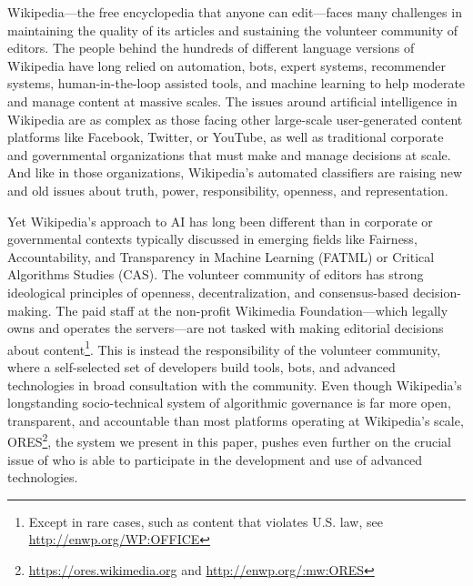 Wikipedia---the free encyclopedia that anyone can edit---faces many challenges in maintaining the quality of its articles and sustaining the volunteer community of editors. The people behind the hundreds of different language versions of Wikipedia have long relied on automation, bots, expert systems, recommender systems, human-in-the-loop assisted tools, and machine learning to help moderate and manage content at massive scales. The issues around artificial intelligence in Wikipedia are as complex as those facing other large-scale user-generated content platforms like Facebook, Twitter, or YouTube, as well as traditional corporate and governmental organizations that must make and manage decisions at scale. And like in those organizations, Wikipedia's automated classifiers are raising new and old issues about truth, power, responsibility, openness, and representation.

Yet Wikipedia's approach to AI has long been different than in corporate or governmental contexts typically discussed in emerging fields like Fairness, Accountability, and Transparency in Machine Learning (FATML) or Critical Algorithms Studies (CAS). The volunteer community of editors has strong ideological principles of openness, decentralization, and consensus-based decision-making. The paid staff at the non-profit Wikimedia Foundation---which legally owns and operates the servers---are not tasked with making editorial decisions about content\footnote{Except in rare cases, such as content that violates U.S. law, see \url{http://enwp.org/WP:OFFICE}}. This is instead the responsibility of the volunteer community, where a self-selected set of developers build tools, bots, and advanced technologies in broad consultation with the community. Even though Wikipedia's longstanding socio-technical system of algorithmic governance is far more open, transparent, and accountable than most platforms operating at Wikipedia's scale, ORES\footnote{\url{https://ores.wikimedia.org} and \url{http://enwp.org/:mw:ORES}}, the system we present in this paper, pushes even further on the crucial issue of who is able to participate in the development and use of advanced technologies.

